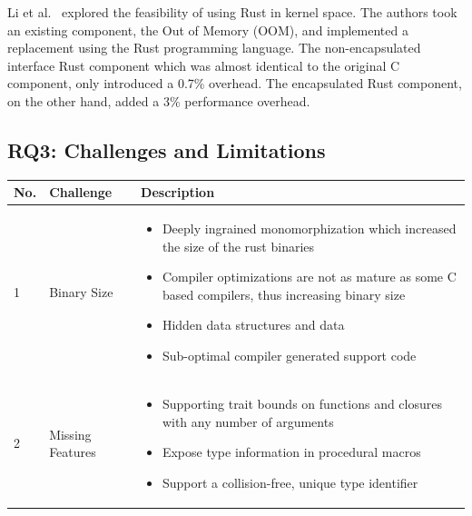 \documentclass[sigconf]{acmart}
\begin{document}
Li et al.~\cite{Li2024-be} explored the feasibility of using Rust in kernel space. The authors took
an existing component, the Out of Memory (OOM), and implemented a replacement using the Rust
programming language. The non-encapsulated interface Rust component which was almost identical to
the original C component, only introduced a 0.7\% overhead. The encapsulated Rust component, on the
other hand, added a 3\% performance overhead. 



\subsection{RQ3: Challenges and Limitations}

\begin{table}
    \begin{tabular}{p{1cm} p{5cm} p{10cm}}
        \hline
        No. & Challenge & Description\\
        \hline
        1 & Binary Size~\cite{Ayers2022-sf}  &
        \begin{itemize}
            \item Deeply ingrained monomorphization which increased the size of the rust binaries
            \item Compiler optimizations are not as mature as some C based compilers, thus increasing binary size
            \item Hidden data structures and data
            \item Sub-optimal compiler generated support code
        \end{itemize}
        \\
        \hline
        2 & Missing Features~\cite{Burtsev2021-mh} &
        \begin{itemize}
            \item Supporting trait bounds on functions and closures with any number of arguments
            \item Expose type information in procedural macros
            \item Support a collision-free, unique type identifier


\end{itemize}
\end{tabular}
\end{table}
\end{document}
